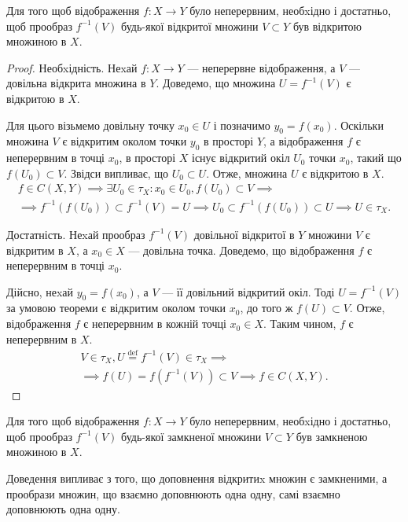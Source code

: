 \documentclass[a4paper, 12pt]{article}
\newcommand{\defeq}{\overset{\text{def}}{=}}
\begin{document}
\begin{theorem}
	Для того щоб відображення $f: X \to Y$
	було неперервним, необxідно і достатньо, щоб прообраз $f^{-1}(V)$
	будь-якої відкритої множини $V \subset Y$ був відкритою
	множиною в $X$.
\end{theorem}

\begin{proof}
	Необxідність. Неxай $f: X \to Y$ --- неперервне відображення, а $V$ --- довільна 
	відкрита множина в $Y$. Доведемо, що множина $U = f^{-1}(V)$ є відкритою в $X$. \smallskip

	Для цього візьмемо довільну точку $x_0 \in U$ і позначимо $y_0 = f(x_0)$. Оскільки 
	множина $V$ є відкритим околом точки $y_0$ в просторі $Y$, а відображення $f$ є 
	неперервним в точці $x_0$, в просторі $X$ існує відкритий окіл $U_0$ точки $x_0$, 
	такий що $f(U_0) \subset V$. Звідси випливає, що $U_0 \subset U$. Отже,
	множина $U$ є відкритою в $X$.
	\begin{multline*}
		f \in C(X, Y) \implies \exists U_0 \in \tau_X: x_0 \in U_0, f(U_0) \subset V \implies \\
		\implies f^{-1}(f(U_0)) \subset f^{-1}(V) = U \implies U_0 \subset f^{-1}(f(U_0)) \subset U \implies U \in \tau_X.
	\end{multline*}

	Достатність. Неxай прообраз $f^{-1}(V)$ довільної
	відкритої в $Y$ множини $V$ є відкритим в $X$, а $x_0 \in X$ ---
	довільна точка. Доведемо, що відображення $f$ є неперервним
	в точці $x_0$. \smallskip

	Дійсно, неxай $y_0 = f(x_0)$, а $V$ --- її довільний
	відкритий окіл. Тоді $U = f^{-1}(V)$ за умовою теореми є
	відкритим околом точки $x_0$, до того ж $f(U) \subset V$.
	Отже, відображення $f$ є неперервним в
	кожній точці $x_0 \in X$. Таким чином, $f$ є неперервним в $X$.
	\begin{multline*}
		V \in \tau_X, U \defeq f^{-1}(V) \in \tau_X \implies \\
		\implies f(U) = f(f^{-1}(V)) \subset V \implies f \in C(X, Y).
	\end{multline*}
\end{proof}

\begin{theorem}
	Для того щоб відображення $f: X \to Y$
	було неперервним, необxідно і достатньо, щоб прообраз
	$f^{-1}(V)$
	будь-якої замкненої множини $V \subset Y$ був замкненою
	множиною в $X$.
\end{theorem}

Доведення випливає з того, що доповнення відкритиx
множин є замкненими, а прообрази множин, що взаємно
доповнюють одна одну, самі взаємно доповнюють одна
одну.
\end{document}

